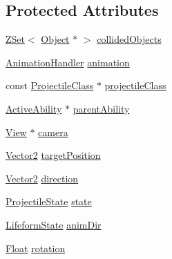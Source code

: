 \subsection*{Protected Attributes}
\begin{DoxyCompactItemize}
\item 
\hyperlink{namespaceZeta_a92c229b4db6ab7275c2b7f32bdfabc87}{Z\+Set}$<$ \hyperlink{classZeta_1_1Object}{Object} $\ast$ $>$ \hyperlink{classZeta_1_1Projectile_a97d2d1a5090514b119db842ebec18cd7}{collided\+Objects}
\item 
\hyperlink{classZeta_1_1AnimationHandler}{Animation\+Handler} \hyperlink{classZeta_1_1Projectile_aefe42e3e404d48862671645fd79d19dd}{animation}
\item 
const \hyperlink{classZeta_1_1ProjectileClass}{Projectile\+Class} $\ast$ \hyperlink{classZeta_1_1Projectile_a21466c968ccab5bd82b9369f6445f094}{projectile\+Class}
\item 
\hyperlink{classZeta_1_1ActiveAbility}{Active\+Ability} $\ast$ \hyperlink{classZeta_1_1Projectile_adef774c425ee6c3af82e408269cfee08}{parent\+Ability}
\item 
\hyperlink{classZeta_1_1View}{View} $\ast$ \hyperlink{classZeta_1_1Projectile_a15208dfa71713b04823b1aa8d2a23a1e}{camera}
\item 
\hyperlink{classZeta_1_1Vector2}{Vector2} \hyperlink{classZeta_1_1Projectile_ac3e3496cf0700e62f7f3d54b782e07e1}{target\+Position}
\item 
\hyperlink{classZeta_1_1Vector2}{Vector2} \hyperlink{classZeta_1_1Projectile_aaf2edb8925817cb4647910eaf4e0c1d7}{direction}
\item 
\hyperlink{classZeta_1_1Projectile_aacad4e6f44c0a40539f4ec22ac93ee27}{Projectile\+State} \hyperlink{classZeta_1_1Projectile_ac6c490114f270934af7728c905d8b9fe}{state}
\item 
\hyperlink{classZeta_1_1LifeformState}{Lifeform\+State} \hyperlink{classZeta_1_1Projectile_a5b028ee3773dd1e5b7cb86dacc757907}{anim\+Dir}
\item 
\hyperlink{namespaceZeta_a1e0a1265f9b3bd3075fb0fabd39088ba}{Float} \hyperlink{classZeta_1_1Projectile_ac8ea8a49b50c1e3ce011ca9e7a03ce3c}{rotation}
\end{DoxyCompactItemize}


